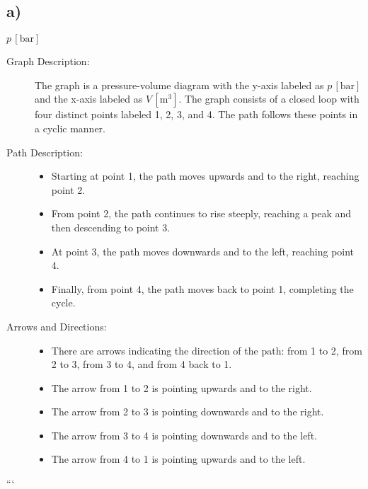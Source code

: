 

\subsection*{a)}

$p \, [\text{bar}]$

\begin{description}
    \item[Graph Description:] The graph is a pressure-volume diagram with the y-axis labeled as \( p \, [\text{bar}] \) and the x-axis labeled as \( V \, [\text{m}^3] \). The graph consists of a closed loop with four distinct points labeled 1, 2, 3, and 4. The path follows these points in a cyclic manner.
    
    \item[Path Description:] 
    \begin{itemize}
        \item Starting at point 1, the path moves upwards and to the right, reaching point 2.
        \item From point 2, the path continues to rise steeply, reaching a peak and then descending to point 3.
        \item At point 3, the path moves downwards and to the left, reaching point 4.
        \item Finally, from point 4, the path moves back to point 1, completing the cycle.
    \end{itemize}
    
    \item[Arrows and Directions:] 
    \begin{itemize}
        \item There are arrows indicating the direction of the path: from 1 to 2, from 2 to 3, from 3 to 4, and from 4 back to 1.
        \item The arrow from 1 to 2 is pointing upwards and to the right.
        \item The arrow from 2 to 3 is pointing downwards and to the right.
        \item The arrow from 3 to 4 is pointing downwards and to the left.
        \item The arrow from 4 to 1 is pointing upwards and to the left.
    \end{itemize}
\end{description}

```